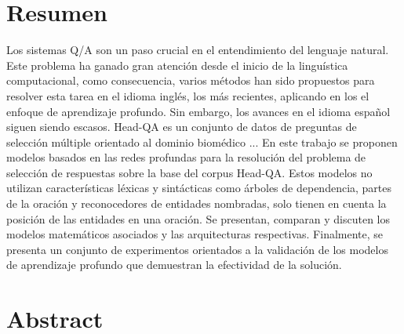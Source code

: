 \chapter*{Resumen}\label{chapter:resumen}

Los sistemas Q/A son un paso crucial en el entendimiento del lenguaje natural. Este problema ha ganado gran atención desde el inicio de la linguística computacional, como consecuencia, varios métodos han sido propuestos para resolver esta tarea en el idioma inglés, los más recientes, aplicando en los el enfoque de aprendizaje profundo. Sin embargo, los avances en el idioma español siguen siendo escasos. Head-QA es un conjunto de datos de preguntas de selección múltiple orientado al dominio biomédico ... En este trabajo se proponen modelos basados en las redes profundas para la resolución del problema de selección de respuestas sobre la base del corpus Head-QA. Estos modelos no utilizan características léxicas y sintácticas como árboles de dependencia, partes de la oración y reconocedores de entidades nombradas, solo tienen en cuenta la posición de las entidades en una oración. Se presentan, comparan y discuten los modelos matemáticos asociados y las arquitecturas respectivas. Finalmente, se presenta un conjunto de experimentos orientados a la validación de los modelos de aprendizaje profundo que demuestran la efectividad de la solución.

\newpage
\chapter*{Abstract}\label{chapter:abstract}